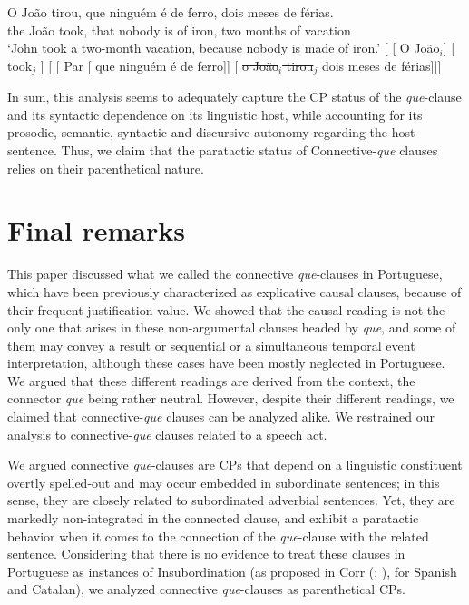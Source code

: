 \documentclass[output=paper,colorlinks,citecolor=brown,
]{langscibook}
\begin{document}
\ea \label{ex:matos:parenteticos-ferias}
 \ea \label{ex:matos:parenteticos-ferias-a}
 \gll O João tirou, que ninguém é de ferro, dois meses de férias.\\ 
	  the João took, that nobody is of iron, two months of vacation\\
 \glt ‘John took a two-month vacation, because nobody is made of iron.’
 \ex \label{ex:matos:parenteticos-ferias-b}
 [ [ O João$_i$] [ took$_j$ ] [ [ Par [ que ninguém é de ferro]] [ \sout{o João$_i$ tirou$_j$} dois meses de férias]]]
 \z
\z 

In sum, this analysis seems to adequately capture the CP status of the \textit{que}-clause and its syntactic dependence on its linguistic host, while accounting for its prosodic, semantic, syntactic and discursive autonomy regarding the host sentence. Thus, we claim that the paratactic status of Connective-\textit{que} clauses relies on their parenthetical nature.

\section{Final remarks} \label{sec:matos:sect6}

This paper discussed what we called the connective \textit{que}-clauses in Portuguese, which have been previously characterized as explicative causal clauses, because of their frequent justification value. We showed that the causal reading is not the only one that arises in these non-argumental clauses headed by \textit{que}, and some of them may convey a result or sequential or a simultaneous temporal event interpretation, although these cases have been mostly neglected in Portuguese. We argued that these different readings are derived from the context, the connector \textit{que} being rather neutral. However, despite their different readings, we claimed that connective-\textit{que} clauses can be analyzed alike. We restrained our analysis to connective-\textit{que} clauses related to a speech act. 

We argued connective \textit{que}-clauses are CPs that depend on a linguistic constituent overtly spelled-out and may occur embedded in subordinate sentences; in this sense, they are closely related to subordinated adverbial sentences. Yet, they are markedly non-integrated in the connected clause, and exhibit a paratactic behavior when it comes to the connection of the \textit{que}-clause with the related sentence. Considering that there is no evidence to treat these clauses in Portuguese as instances of Insubordination (as proposed in Corr (\citeyear{corr_ibero-romance_2016}; \citeyear{corr_matrix_2018}), for Spanish and Catalan), we analyzed connective \textit{que}-clauses as parenthetical CPs. 
\end{document}
